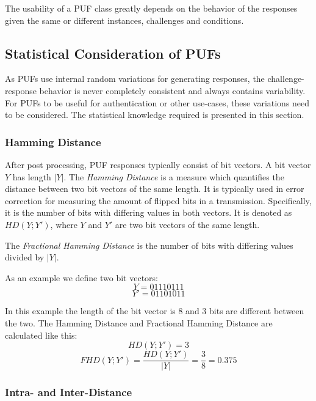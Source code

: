 The usability of a PUF class greatly depends on the behavior of the responses given the same or different instances,
challenges and conditions.




\subsection{Statistical Consideration of PUFs}
\label{sec:statistical_considerations}

As PUFs use internal random variations for generating responses, the challenge-response behavior is never completely
consistent and always contains variability. For PUFs to be useful for authentication or other use-cases,
these variations need to be considered. The statistical knowledge required is presented in this section.

\subsubsection{Hamming Distance}

After post processing, PUF responses typically consist of bit vectors. A bit vector $Y$ has length $|Y|$.
The \emph{Hamming Distance} is a measure which quantifies the distance between two bit vectors of the same length.
It is typically used in error correction for measuring the amount of flipped bits in a transmission.
Specifically, it is the number of bits with differing values in both vectors. It is denoted as $HD(Y;Y')$, where
$Y$ and $Y'$ are two bit vectors of the same length. \cite[][p. 173f]{Maes2013}

The \emph{Fractional Hamming Distance} is the number of bits with differing values divided by $|Y|$. \cite[][p. 173f]{Maes2013}

As an example we define two bit vectors:
\[Y =  01110111\]
\[Y' = 01101011\]

In this example the length of the bit vector is $8$ and $3$ bits are different between the two.
The Hamming Distance and Fractional Hamming Distance are calculated like this:
\[HD(Y;Y') = 3\]
\[FHD(Y;Y') = \frac{HD(Y;Y')}{|Y|} = \frac{3}{8} = 0.375\]

\subsubsection{Intra- and Inter-Distance}
\label{sec:intra_inter_distance}

